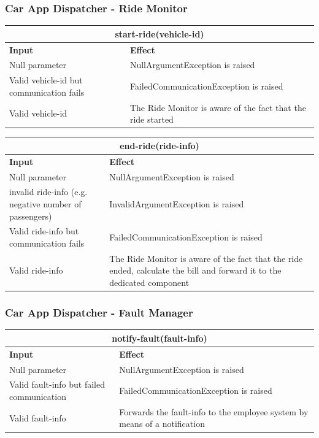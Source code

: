 \documentclass{article}
\begin{document}
\subsubsection{Car App Dispatcher - Ride Monitor}
\begin{tabular}{ |p{5cm}|p{7cm}| }
  \hline
  \multicolumn{2}{|c|}{start-ride(vehicle-id)} \\
  \hline
  \textbf{Input} & \textbf{Effect} \\
  \hline
   Null parameter & NullArgumentException is raised\\
  \hline
  Valid vehicle-id but communication fails & FailedCommunicationException is raised\\
  \hline
 Valid vehicle-id & The Ride Monitor is aware of the fact that the ride started \\
  \hline
\end{tabular}
\begin{tabular}{ |p{5cm}|p{7cm}| }
  \hline
  \multicolumn{2}{|c|}{end-ride(ride-info)} \\
  \hline
  \textbf{Input} & \textbf{Effect} \\
  \hline
   Null parameter & NullArgumentException is raised\\
  \hline
  invalid ride-info (e.g. negative number of passengers) & InvalidArgumentException is raised\\
  \hline
  Valid ride-info but communication fails & FailedCommunicationException is raised\\
  \hline
 Valid ride-info & The Ride Monitor is aware of the fact that the ride ended, calculate the bill and forward it to the dedicated component \\
  \hline
\end{tabular}
\subsubsection{Car App Dispatcher - Fault Manager}
\begin{tabular}{ |p{5cm}|p{7cm}| }
  \hline
  \multicolumn{2}{|c|}{notify-fault(fault-info)} \\
  \hline
  \textbf{Input} & \textbf{Effect} \\
  \hline
  Null parameter & NullArgumentException is raised\\
  \hline
  Valid fault-info but failed communication & FailedCommunicationException is raised\\
  \hline
  Valid fault-info & Forwards the fault-info to the employee system by means of a notification\\
  \hline
\end{tabular}
\end{document}
